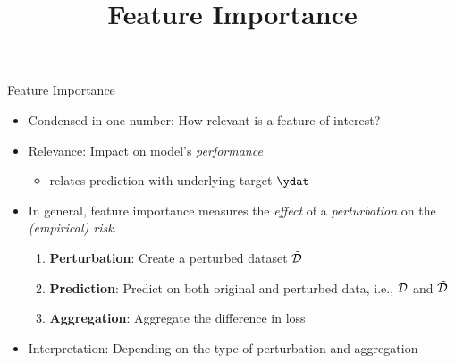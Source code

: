 \documentclass[11pt,compress,t,notes=noshow, xcolor=table]{beamer}
\title{Feature Importance}
\institute{\href{https://compstat-lmu.github.io/lecture_i2ml/}{compstat-lmu.github.io/lecture\_i2ml}}
\date{}
\begin{document}
	
	
	
	
	
	
	
	
	
	


\begin{vbframe}{Feature Importance}

\begin{itemize}
  \item Condensed in one number: How relevant is a feature of interest?
  \item Relevance: Impact on model's \textit{performance}
  \begin{itemize}
    \item relates prediction with underlying target $\ydat$
  \end{itemize}
  \item In general, feature importance measures the \textit{effect} of a \textit{perturbation} on the \textit{(empirical) risk}.

\begin{enumerate}
  \item \textbf{Perturbation}: Create a perturbed dataset $\pert{\D}{}{}$
  \item \textbf{Prediction}: Predict on both original and perturbed data, i.e., $\D$ and $\pert{\D}{}{}$
  \item \textbf{Aggregation}: Aggregate the difference in loss
\end{enumerate}
  \item Interpretation: Depending on the type of perturbation and aggregation
\end{itemize}



\end{vbframe}
\end{document}
